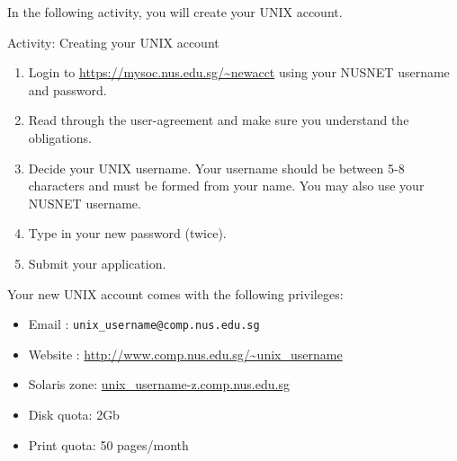 In the following activity, you will create your UNIX account.  

\begin{frame}{Activity: Creating your UNIX account}
\begin{enumerate}
\item Login to \url{https://mysoc.nus.edu.sg/~newacct} using your NUSNET
username and password.  
\item Read through the user-agreement and make sure you understand the
obligations. 
\item Decide your UNIX username.  Your username should be between 5-8 characters and
must be formed from your name.  You may also use your NUSNET username. 
\item Type in your new password (twice).
\item Submit your application.
\end{enumerate}
\end{frame}

\begin{frame}
Your new UNIX account comes with the following privileges:
\begin{itemize}
\item Email : \texttt{unix\_username@comp.nus.edu.sg}
\item Website : \url{http://www.comp.nus.edu.sg/~unix_username}
\item Solaris zone: \url{unix_username-z.comp.nus.edu.sg}
\item Disk quota: 2Gb
\item Print quota: 50 pages/month
\end{itemize}
\end{frame}


